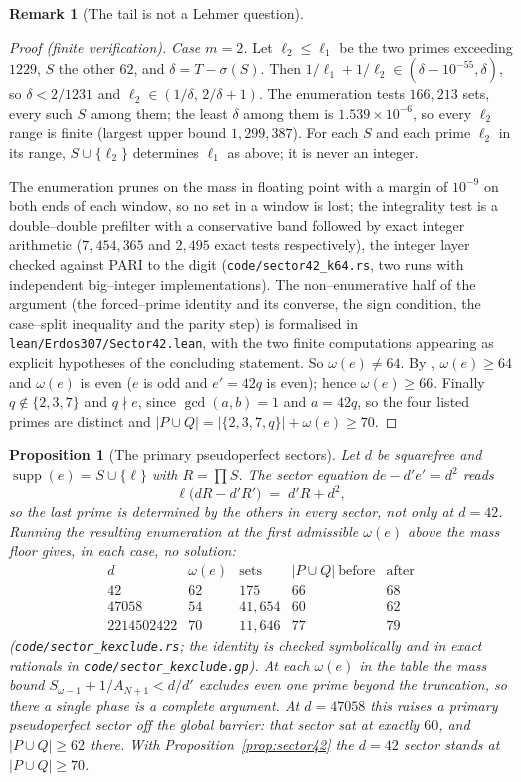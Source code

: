 \documentclass[11pt]{article}
\newtheorem{proposition}[theorem]{Proposition}
\theoremstyle{definition}
\newtheorem{remark}[theorem]{Remark}
\begin{document}
\begin{remark}[The tail is not a Lehmer question]
\begin{proof}[Proof (finite verification)]
\emph{Case $m=2$.} Let $\ell_2\le\ell_1$ be the two primes exceeding $1229$, $S$ the other $62$, and
$\delta=T-\sigma(S)$. Then $1/\ell_1+1/\ell_2\in(\delta-10^{-55},\delta)$, so $\delta<2/1231$ and
$\ell_2\in(1/\delta,\,2/\delta+1)$. The enumeration tests $166{,}213$ sets, every such $S$ among them; the least $\delta$ among them is
$1.539\times10^{-6}$, so every $\ell_2$ range is finite (largest upper bound $1{,}299{,}387$). For each
$S$ and each prime $\ell_2$ in its range, $S\cup\{\ell_2\}$ determines $\ell_1$ as above; it is never
an integer.

The enumeration prunes on the mass in floating point with a margin of $10^{-9}$ on both ends of each
window, so no set in a window is lost; the integrality test is a double--double prefilter with a
conservative band followed by exact integer arithmetic ($7{,}454{,}365$ and $2{,}495$ exact tests
respectively), the integer layer checked against PARI to the digit
\textup{(\texttt{code/sector42\_k64.rs}, two runs with independent big--integer implementations)}. The
non--enumerative half of the argument (the forced--prime identity and its converse, the sign
condition, the case--split inequality and the parity step) is formalised in
\texttt{lean/Erdos307/Sector42.lean}, with the two finite computations appearing as explicit
hypotheses of the concluding statement.
So $\omega(e)\ne64$. By \cite{Bado2026b}, $\omega(e)\ge64$ and $\omega(e)$ is even ($e$ is odd and
$e'=42q$ is even); hence $\omega(e)\ge66$. Finally $q\notin\{2,3,7\}$ and $q\nmid e$, since $\gcd(a,b)=1$ and
$a=42q$, so the four listed primes are distinct and $|P\cup Q|=|\{2,3,7,q\}|+\omega(e)\ge70$.
\end{proof}

\begin{proposition}[The primary pseudoperfect sectors]\label{prop:ppnsectors}
Let $d$ be squarefree and $\operatorname{supp}(e)=S\cup\{\ell\}$ with $R=\prod S$. The sector
equation $de-d'e'=d^2$ reads
\[ \ell\bigl(dR-d'R'\bigr)\;=\;d'R+d^2, \]
so the last prime is determined by the others in every sector, not only at $d=42$. Running the
resulting enumeration at the first admissible $\omega(e)$ above the mass floor gives, in each case,
no solution:
\[\begin{array}{lrrrl}
d & \omega(e) & \text{sets} & |P\cup Q|\ \text{before} & \text{after}\\[2pt]
42 & 62 & 175 & 66 & 68\\
47058 & 54 & 41{,}654 & 60 & 62\\
2214502422 & 70 & 11{,}646 & 77 & 79
\end{array}\]
\textup{(\texttt{code/sector\_kexclude.rs}; the identity is checked symbolically and in exact
rationals in \texttt{code/sector\_kexclude.gp})}. At each $\omega(e)$ in the table the mass bound
$S_{\omega-1}+1/A_{N+1}<d/d'$ excludes even one prime beyond the truncation, so there a single phase
is a complete argument. At $d=47058$ this raises a primary pseudoperfect sector off the global
barrier: that sector sat at exactly $60$, and $|P\cup Q|\ge62$ there. With
Proposition~\ref{prop:sector42} the $d=42$ sector stands at $|P\cup Q|\ge70$.


\end{proposition}
\end{remark}
\end{document}
